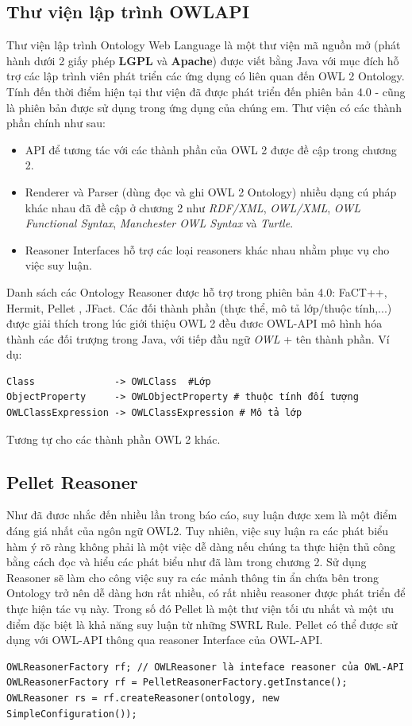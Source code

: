\subsection{Thư viện lập trình OWLAPI}
Thư viện lập trình Ontology Web Language là một thư viện mã nguồn mở (phát hành dưới 2 giấy phép \textbf{LGPL} và \textbf{Apache}) \cite{owlapi} được viết bằng Java với mục đích hỗ trợ các lập trình viên phát triển các ứng dụng có liên quan đến OWL 2 Ontology. Tính đến thời điểm hiện tại thư viện đã được phát triển đến phiên bản 4.0 - cũng là phiên bản được sử dụng trong ứng dụng của chúng em.
Thư viện có các thành phần chính như sau: 
\begin{itemize}
	\item API để tương tác với các thành phần của OWL 2 được đề cập trong chương 2.
	\item Renderer và Parser (dùng đọc và ghi OWL 2 Ontology) nhiều dạng cú pháp khác nhau đã đề cập ở chương 2 như \textit{RDF/XML}, \textit{OWL/XML}, \textit{OWL Functional Syntax}, \textit{Manchester OWL Syntax} và \textit{Turtle}.
	\item Reasoner Interfaces hỗ trợ các loại reasoners khác nhau nhằm phục vụ cho việc suy luận.
\end{itemize}
Danh sách các Ontology Reasoner được hỗ trợ trong phiên bản 4.0: FaCT++, Hermit, Pellet \cite{pellet}, JFact.
Các đối thành phần (thực thể, mô tả lớp/thuộc tính,...) được giải thích trong lúc giới thiệu OWL 2 đều đươc OWL-API mô hình hóa thành các đối trượng trong Java, với tiếp đầu ngữ \textit{OWL} + tên thành phần. Ví dụ:
\begin{verbatim}
Class              -> OWLClass  #Lớp
ObjectProperty     -> OWLObjectProperty # thuộc tính đối tượng
OWLClassExpression -> OWLClassExpression # Mô tả lớp
\end{verbatim} 
Tương tự cho các thành phần OWL 2 khác.
\subsection{Pellet Reasoner}
Như đã đươc nhắc đến nhiều lần trong báo cáo, suy luận được xem là một điểm đáng giá nhất của ngôn ngữ OWL2. Tuy nhiên, việc suy luận ra các phát biểu hàm ý rõ ràng không phải là một việc dễ dàng nếu chúng ta thực hiện thủ công bằng cách đọc và hiểu các phát biểu như đã làm trong chương 2. Sử dụng Reasoner sẽ làm cho công việc suy ra các mảnh thông tin ẩn chứa bên trong Ontology trở nên dễ dàng hơn rất nhiều, có rất nhiều reasoner được phát triển để thực hiện tác vụ này. Trong số đó Pellet \cite{pellet} là một thư viện tối ưu nhất và một ưu điểm đặc biệt là khả năng suy luận từ những SWRL Rule. Pellet có thể được sử dụng với OWL-API thông qua reasoner Interface của OWL-API.
\begin{verbatim}
OWLReasonerFactory rf; // OWLReasoner là inteface reasoner của OWL-API
OWLReasonerFactory rf = PelletReasonerFactory.getInstance();
OWLReasoner rs = rf.createReasoner(ontology, new SimpleConfiguration());
\end{verbatim}
